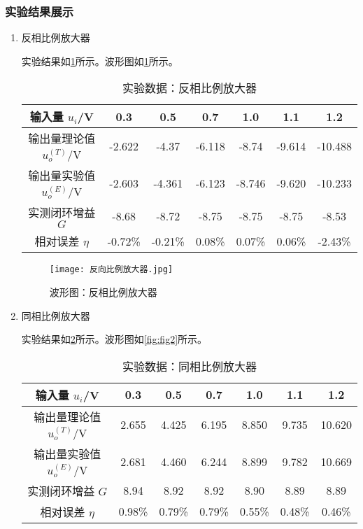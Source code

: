 \documentclass[dvipsnames, svgnames,a4paper,11pt]{article}
\begin{document}
	\subsubsection{实验结果展示}
	\begin{enumerate}
		\item 反相比例放大器
		
		实验结果如\cref{tab:tab1}所示。波形图如\cref{fig:fig1}所示。
		
		\begin{table}[htbp]
			\centering
			\caption{实验数据：反相比例放大器}
			\label{tab:tab1}
			\begin{tabular}{|c|c|c|c|c|c|c|}
				\hline
				输入量 \( u_i \)/V & 0.3 & 0.5 & 0.7 & 1.0 & 1.1 & 1.2 \\
				\hline
				输出量理论值 \( u_o^{(T)} \)/V & -2.622 & -4.37 & -6.118 & -8.74 & -9.614 & -10.488 \\
				输出量实验值 \( u_o^{(E)} \)/V & -2.603 & -4.361 & -6.123 & -8.746 & -9.620 & -10.233 \\
				实测闭环增益 \( G \) & -8.68 & -8.72 & -8.75 & -8.75 & -8.75 & -8.53 \\
				相对误差 \( \eta \) & -0.72\% & -0.21\% & 0.08\% & 0.07\% & 0.06\% & -2.43\% \\
				\hline
			\end{tabular}
		\end{table}
		
		\begin{figure}[htbp]
			\centering
			\texttt{[image: 反向比例放大器.jpg]}
			\caption{波形图：反相比例放大器}
			\label{fig:fig1}
		\end{figure}		
		
		\item 同相比例放大器
		
		实验结果如\cref{tab:tab2}所示。波形图如\cref{fig:fig2}所示。
		
		\begin{table}[htbp]
			\centering
			\caption{实验数据：同相比例放大器}
			\label{tab:tab2}
			\begin{tabular}{|c|c|c|c|c|c|c|}
				\hline
				输入量 \( u_i \)/V & 0.3 & 0.5 & 0.7 & 1.0 & 1.1 & 1.2 \\
				\hline
				输出量理论值 \( u_o^{(T)} \)/V & 2.655 & 4.425 & 6.195 & 8.850 & 9.735 & 10.620 \\
				输出量实验值 \( u_o^{(E)} \)/V & 2.681 & 4.460 & 6.244 & 8.899 & 9.782 & 10.669 \\
				实测闭环增益 \( G \) & 8.94 & 8.92 & 8.92 & 8.90 & 8.89 & 8.89 \\
				相对误差 \( \eta \) & 0.98\% & 0.79\% & 0.79\% & 0.55\% & 0.48\% & 0.46\% \\
				\hline
			\end{tabular}
		\end{table}	
		

\end{enumerate}
\end{document}
